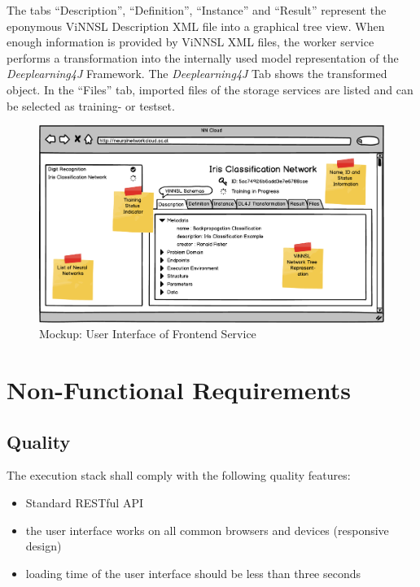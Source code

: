 The tabs ``Description'', ``Definition'', ``Instance'' and ``Result''
represent the eponymous ViNNSL Description XML file into a graphical
tree view. When enough information is provided by ViNNSL XML files, the
worker service performs a transformation into the internally used model
representation of the \emph{Deeplearning4J} Framework. The
\emph{Deeplearning4J} Tab shows the transformed object. In the ``Files''
tab, imported files of the storage services are listed and can be
selected as training- or testset.

\begin{figure}
\centering
\includegraphics[width=17.00000cm]{./images/vinnsl-ui-mockup}
\caption{Mockup: User Interface of Frontend
Service\label{vinnsl-ui-mockup}}
\end{figure}

\section{Non-Functional Requirements}\label{non-functional-requirements}

\subsection{Quality}\label{quality}

The execution stack shall comply with the following quality features:

\begin{itemize}
\tightlist
\item
  Standard RESTful API
\item
  the user interface works on all common browsers and devices
  (responsive design)
\item
  loading time of the user interface should be less than three seconds
\end{itemize}

